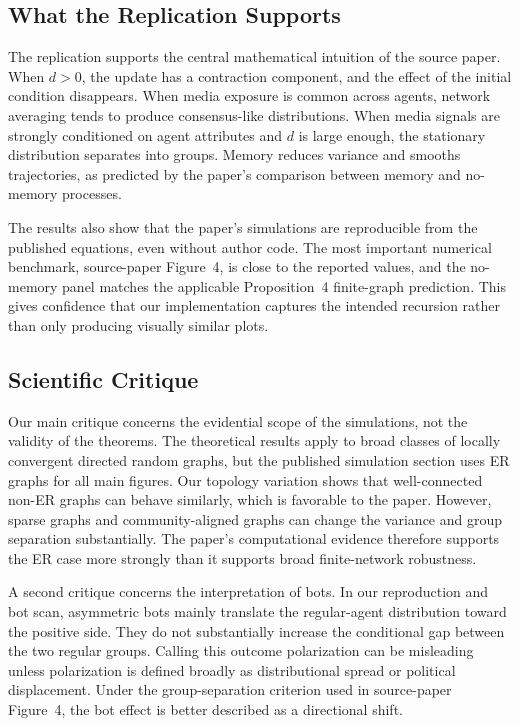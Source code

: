 \documentclass[11pt]{article}
\begin{document}
\subsection{What the Replication Supports}

The replication supports the central mathematical intuition of the source
paper.  When $d>0$, the update has a contraction component, and the effect of
the initial condition disappears.  When media exposure is common across agents,
network averaging tends to produce consensus-like distributions.  When media
signals are strongly conditioned on agent attributes and $d$ is large enough,
the stationary distribution separates into groups.  Memory reduces variance and
smooths trajectories, as predicted by the paper's comparison between memory and
no-memory processes.

The results also show that the paper's simulations are reproducible from the
published equations, even without author code.  The most important numerical
benchmark, source-paper Figure~4, is close to the reported values, and the
no-memory panel matches the applicable Proposition~4 finite-graph prediction.
This gives confidence that our implementation captures the intended recursion
rather than only producing visually similar plots.

\subsection{Scientific Critique}

Our main critique concerns the evidential scope of the simulations, not the
validity of the theorems.  The theoretical results apply to broad classes of
locally convergent directed random graphs, but the published simulation section
uses ER graphs for all main figures.  Our topology variation shows that
well-connected non-ER graphs can behave similarly, which is favorable to the
paper.  However, sparse graphs and community-aligned graphs can change the
variance and group separation substantially.  The paper's computational
evidence therefore supports the ER case more strongly than it supports broad
finite-network robustness.

A second critique concerns the interpretation of bots.  In our reproduction and
bot scan, asymmetric bots mainly translate the regular-agent distribution
toward the positive side.  They do not substantially increase the conditional
gap between the two regular groups.  Calling this outcome polarization can be
misleading unless polarization is defined broadly as distributional spread or
political displacement.  Under the group-separation criterion used in
source-paper Figure~4, the bot effect is better described as a directional
shift.
\end{document}
